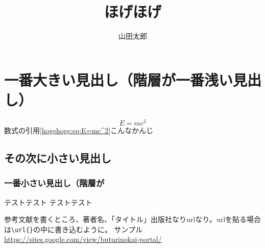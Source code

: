 \documentclass[a4paper,oneside]{jsbook}
\begin{document}
\title{ほげほげ}
\author{山田太郎}
\date{}%
\maketitle


\section{一番大きい見出し（階層が一番浅い見出し）}
\begin{equation}
  E=mc^2\label{hogehoge:eq:E=mc^2}
\end{equation}
数式の引用\eqref{hogehoge:eq:E=mc^2}こんなかんじ

\subsection{その次に小さい見出し}

\subsubsection{一番小さい見出し（階層が}
テストテスト
テストテスト






\let\oldaddcontentsline\addcontentsline%
\renewcommand{\addcontentsline}[3]{}
\begin{thebibliography}{99}
    参考文献を書くところ、著者名、「タイトル」出版社なりurlなり。urlを貼る場合は\verb|\url{}|の中に書き込むように。
    サンプル\url{https://sites.google.com/view/buturinokai-portal/}
\end{thebibliography}
\let\addcontentsline\oldaddcontentsline
\end{document}
